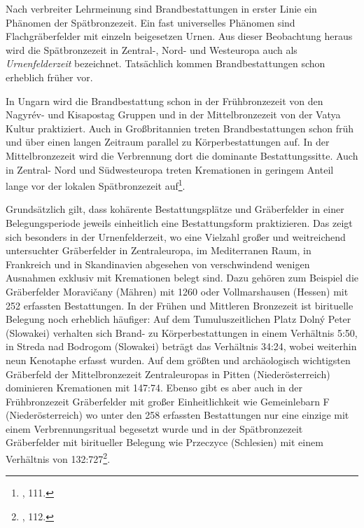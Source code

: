 \documentclass[openany,twoside,twocolumn]{book}
\let\rmarkdownfootnote\footnote%
\def\footnote{\protect\rmarkdownfootnote}
\begin{document}
Nach verbreiter Lehrmeinung sind Brandbestattungen in erster Linie ein
Phänomen der Spätbronzezeit. Ein fast universelles Phänomen sind
Flachgräberfelder mit einzeln beigesetzen Urnen. Aus dieser Beobachtung
heraus wird die Spätbronzezeit in Zentral-, Nord- und Westeuropa auch
als \emph{Urnenfelderzeit} bezeichnet. Tatsächlich kommen
Brandbestattungen schon erheblich früher vor.

In Ungarn wird die Brandbestattung schon in der Frühbronzezeit von den
Nagyrév- und Kisapostag Gruppen und in der Mittelbronzezeit von der
Vatya Kultur praktiziert. Auch in Großbritannien treten
Brandbestattungen schon früh und über einen langen Zeitraum parallel zu
Körperbestattungen auf. In der Mittelbronzezeit wird die Verbrennung
dort die dominante Bestattungssitte. Auch in Zentral- Nord und
Südwesteuropa treten Kremationen in geringem Anteil lange vor der
lokalen Spätbronzezeit auf\footnote{\textcite{harding_european_2000},
  111.}.

Grundsätzlich gilt, dass kohärente Bestattungsplätze und Gräberfelder in
einer Belegungsperiode jeweils einheitlich eine Bestattungsform
praktizieren. Das zeigt sich besonders in der Urnenfelderzeit, wo eine
Vielzahl großer und weitreichend untersuchter Gräberfelder in
Zentraleuropa, im Mediterranen Raum, in Frankreich und in Skandinavien
abgesehen von verschwindend wenigen Ausnahmen exklusiv mit Kremationen
belegt sind. Dazu gehören zum Beispiel die Gräberfelder Moravičany
(Mähren) mit 1260 oder Vollmarshausen (Hessen) mit 252 erfassten
Bestattungen. In der Frühen und Mittleren Bronzezeit ist birituelle
Belegung noch erheblich häufiger: Auf dem Tumuluszeitlichen Platz Dolný
Peter (Slowakei) verhalten sich Brand- zu Körperbestattungen in einem
Verhältnis 5:50, in Streda nad Bodrogom (Slowakei) beträgt das
Verhältnis 34:24, wobei weiterhin neun Kenotaphe erfasst wurden. Auf dem
größten und archäologisch wichtigsten Gräberfeld der Mittelbronzezeit
Zentraleuropas in Pitten (Niederösterreich) dominieren Kremationen mit
147:74. Ebenso gibt es aber auch in der Frühbronzezeit Gräberfelder mit
großer Einheitlichkeit wie Gemeinlebarn F (Niederösterreich) wo unter
den 258 erfassten Bestattungen nur eine einzige mit einem
Verbrennungsritual begesetzt wurde und in der Spätbronzezeit
Gräberfelder mit biritueller Belegung wie Przeczyce (Schlesien) mit
einem Verhältnis von 132:727\footnote{\textcite{harding_european_2000},
  112.}.
\end{document}
